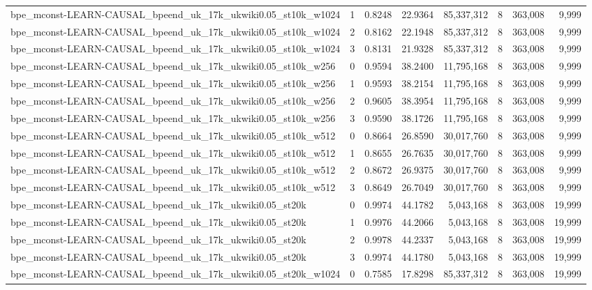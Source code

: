 \begin{tabular}{lrrrrrrr}
bpe\_mconst-LEARN-CAUSAL\_bpeend\_uk\_17k\_ukwiki0.05\_st10k\_w1024 & 1 & 0.8248 & 22.9364 & 85,337,312 & 8 & 363,008 & 9,999 \\
bpe\_mconst-LEARN-CAUSAL\_bpeend\_uk\_17k\_ukwiki0.05\_st10k\_w1024 & 2 & 0.8162 & 22.1948 & 85,337,312 & 8 & 363,008 & 9,999 \\
bpe\_mconst-LEARN-CAUSAL\_bpeend\_uk\_17k\_ukwiki0.05\_st10k\_w1024 & 3 & 0.8131 & 21.9328 & 85,337,312 & 8 & 363,008 & 9,999 \\
bpe\_mconst-LEARN-CAUSAL\_bpeend\_uk\_17k\_ukwiki0.05\_st10k\_w256 & 0 & 0.9594 & 38.2400 & 11,795,168 & 8 & 363,008 & 9,999 \\
bpe\_mconst-LEARN-CAUSAL\_bpeend\_uk\_17k\_ukwiki0.05\_st10k\_w256 & 1 & 0.9593 & 38.2154 & 11,795,168 & 8 & 363,008 & 9,999 \\
bpe\_mconst-LEARN-CAUSAL\_bpeend\_uk\_17k\_ukwiki0.05\_st10k\_w256 & 2 & 0.9605 & 38.3954 & 11,795,168 & 8 & 363,008 & 9,999 \\
bpe\_mconst-LEARN-CAUSAL\_bpeend\_uk\_17k\_ukwiki0.05\_st10k\_w256 & 3 & 0.9590 & 38.1726 & 11,795,168 & 8 & 363,008 & 9,999 \\
bpe\_mconst-LEARN-CAUSAL\_bpeend\_uk\_17k\_ukwiki0.05\_st10k\_w512 & 0 & 0.8664 & 26.8590 & 30,017,760 & 8 & 363,008 & 9,999 \\
bpe\_mconst-LEARN-CAUSAL\_bpeend\_uk\_17k\_ukwiki0.05\_st10k\_w512 & 1 & 0.8655 & 26.7635 & 30,017,760 & 8 & 363,008 & 9,999 \\
bpe\_mconst-LEARN-CAUSAL\_bpeend\_uk\_17k\_ukwiki0.05\_st10k\_w512 & 2 & 0.8672 & 26.9375 & 30,017,760 & 8 & 363,008 & 9,999 \\
bpe\_mconst-LEARN-CAUSAL\_bpeend\_uk\_17k\_ukwiki0.05\_st10k\_w512 & 3 & 0.8649 & 26.7049 & 30,017,760 & 8 & 363,008 & 9,999 \\
bpe\_mconst-LEARN-CAUSAL\_bpeend\_uk\_17k\_ukwiki0.05\_st20k & 0 & 0.9974 & 44.1782 & 5,043,168 & 8 & 363,008 & 19,999 \\
bpe\_mconst-LEARN-CAUSAL\_bpeend\_uk\_17k\_ukwiki0.05\_st20k & 1 & 0.9976 & 44.2066 & 5,043,168 & 8 & 363,008 & 19,999 \\
bpe\_mconst-LEARN-CAUSAL\_bpeend\_uk\_17k\_ukwiki0.05\_st20k & 2 & 0.9978 & 44.2337 & 5,043,168 & 8 & 363,008 & 19,999 \\
bpe\_mconst-LEARN-CAUSAL\_bpeend\_uk\_17k\_ukwiki0.05\_st20k & 3 & 0.9974 & 44.1780 & 5,043,168 & 8 & 363,008 & 19,999 \\
bpe\_mconst-LEARN-CAUSAL\_bpeend\_uk\_17k\_ukwiki0.05\_st20k\_w1024 & 0 & 0.7585 & 17.8298 & 85,337,312 & 8 & 363,008 & 19,999 \\

\end{tabular}
